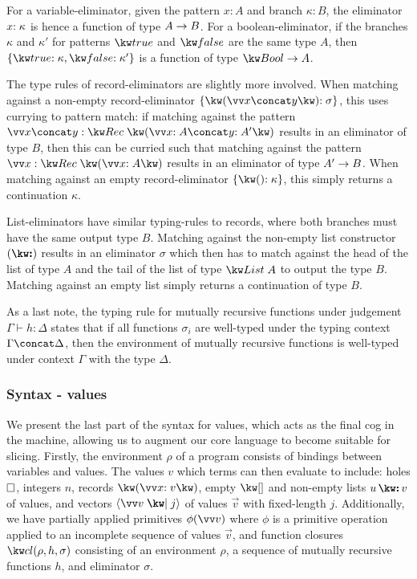 For a variable-eliminator, given the pattern $x : A$ and branch $\kappa : B$, the eliminator ${x}{:}\;{\kappa}$ is hence a function of type ${A}\rightarrow{B}$. For a boolean-eliminator, if the branches $\kappa$ and $\kappa'$ for patterns $\exTrue$ and $\exFalse$ are the same type $A$, then $\elimBool{\kappa}{\kappa'}$ is a function of type $\tyFun{\tyBool}{A}$. 

The type rules of record-eliminators are slightly more involved. When matching against a non-empty record-eliminator $\elimRec{\vec{x} \concat y}{\sigma}$, this uses currying to pattern match: if matching against the pattern $\vec{x} \concat y : \tyRec{\vec{\bind{x}{A}} \concat \bind{y}{A'}}$ results in an eliminator of type $B$, then this can be curried such that matching against the pattern $\vec{x} : \tyRec{\vec{\bind{x}{A}}}$ results in an eliminator of type ${A'}\rightarrow{B}$. When matching against an empty record-eliminator $\elimRecEmpty{\kappa}$, this simply returns a continuation $\kappa$. 

List-eliminators have similar typing-rules to records, where both branches must have the same output type $B$. Matching against the non-empty list constructor $(\symCons)$ results in an eliminator $\sigma$ which then has to match against the head of the list of type $A$ and the tail of the list of type $\tyList{A}$ to output the type $B$. Matching against an empty list simply returns a continuation of type $B$.

As a last note, the typing rule for mutually recursive functions under judgement $\Gamma \vdash h: \Delta$ states that if all functions $\sigma_i$ are well-typed under the typing context $\Gamma \concat \Delta$, then the environment of mutually recursive functions is well-typed under context $\Gamma$ with the type $\Delta$.




\subsubsection{Syntax - values}
We present the last part of the syntax for values, which acts as the final cog in the machine, allowing us to augment our core language to become suitable for slicing. Firstly, the environment $\rho$ of a program consists of bindings between variables and values. The values $v$ which terms can then evaluate to include: holes $\square$, integers $n$, records $\exRec{\vec{\bind{x}{v}}}$, empty $\exNil$ and non-empty lists $\exCons{u}{v}$ of values, and vectors $\exVecVal{\vec{v}}{j}$ of values $\vec{v}$ with fixed-length $j$. Additionally, we have partially applied primitives $\exPrimOp{\phi}{\vec{v}}$ where $\phi$ is a primitive operation applied to an incomplete sequence of values $\vec{v}$, and function closures $\exClosure{\rho}{h}{\sigma}$ consisting of an environment $\rho$, a sequence of mutually recursive functions $h$, and eliminator $\sigma$. 


